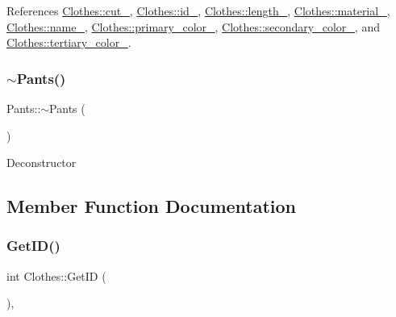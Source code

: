 References \mbox{\hyperlink{classClothes_ac1c2286c8928a5eee91d818a098a44ac}{Clothes\+::cut\+\_\+}}, \mbox{\hyperlink{classClothes_a8978d931db5ca47c3ccea30def4ae83e}{Clothes\+::id\+\_\+}}, \mbox{\hyperlink{classClothes_ae02603eda727e33caf46ec30e761e3c3}{Clothes\+::length\+\_\+}}, \mbox{\hyperlink{classClothes_adbb9ed311f14ccbb1e4fe0e8378a95d4}{Clothes\+::material\+\_\+}}, \mbox{\hyperlink{classClothes_a7f2275aaae24224d60c48af922c31b65}{Clothes\+::name\+\_\+}}, \mbox{\hyperlink{classClothes_a7cb005bf6cbb7f4eaa40f1b31817559c}{Clothes\+::primary\+\_\+color\+\_\+}}, \mbox{\hyperlink{classClothes_ab8f55f67b956b25d71260cffcf273673}{Clothes\+::secondary\+\_\+color\+\_\+}}, and \mbox{\hyperlink{classClothes_a3c5f1e7ab531e3ba7a38b930da8078a0}{Clothes\+::tertiary\+\_\+color\+\_\+}}.

\mbox{\label{classPants_a22fa728c533ab55fbbd1b77b8d9ad860}} 
\subsubsection{\texorpdfstring{$\sim$\+Pants()}{~Pants()}}
{\footnotesize\ttfamily Pants\+::$\sim$\+Pants (\begin{DoxyParamCaption}{ }\end{DoxyParamCaption})\hspace{0.3cm}{\ttfamily [virtual]}}

Deconstructor 

\subsection{Member Function Documentation}
\mbox{\label{classClothes_a3f6dac172f333126d19010f85ec44e4c}} 
\subsubsection{\texorpdfstring{Get\+I\+D()}{GetID()}}
{\footnotesize\ttfamily int Clothes\+::\+Get\+ID (\begin{DoxyParamCaption}{ }\end{DoxyParamCaption})\hspace{0.3cm}{\ttfamily [inline]}, {\ttfamily [inherited]}}

